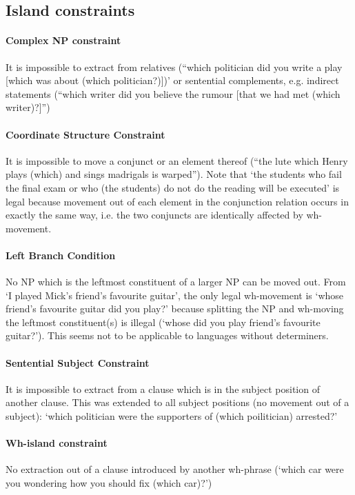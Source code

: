 \documentclass{article}
\begin{document}
\begin{itemize}
    \subsection{Island constraints}
    \paragraph{Complex NP constraint} It is impossible to extract from relatives (``which politician did you write a play [which was about (which politician?)])' or sentential complements, e.g. indirect statements (``which writer did you believe the rumour [that we had met (which writer)?]'')
    \paragraph{Coordinate Structure Constraint} It is impossible to move a conjunct or an element thereof (``the lute which Henry plays (which) and sings madrigals is warped''). Note that `the students who fail the final exam or who (the students) do not do the reading will be executed' is legal because movement out of each element in the conjunction relation occurs in exactly the same way, i.e. the two conjuncts are identically affected by wh-movement.
    \paragraph{Left Branch Condition} No NP which is the leftmost constituent of a larger NP can be moved out. From `I played Mick's friend's favourite guitar', the only legal wh-movement is `whose friend's favourite guitar did you play?' because splitting the NP and wh-moving the leftmost constituent(s) is illegal (`whose did you play friend's favourite guitar?'). This seems not to be applicable to languages without determiners.
    \paragraph{Sentential Subject Constraint} It is impossible to extract from a clause which is in the subject position of another clause. This was extended to all subject positions (no movement out of a subject): `which politician were the supporters of (which poilitician) arrested?'
    \paragraph{Wh-island constraint} No extraction out of a clause introduced by another wh-phrase (`which car were you wondering how you should fix (which car)?')

\end{itemize}
\end{document}
